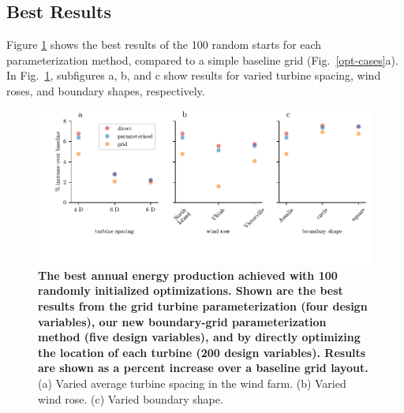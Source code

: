 \documentclass[wes, manuscript]{copernicus}
\begin{document}
\subsection{Best Results}
\label{max-results}
Figure \ref{results-max} 
shows the best results of the 100 random starts for each parameterization method, compared to a simple baseline grid (Fig.~\ref{opt-cases}a). In Fig.~\ref{results-max}, subfigures a, b, and c show results for varied turbine spacing, wind roses, and boundary shapes, respectively.

\begin{figure}
\centering
\includegraphics{paper-figures/results_max.pdf}
\caption{\textbf{The best annual energy production achieved with 100 randomly initialized optimizations. Shown are the best results from the grid turbine parameterization (four design variables), our new boundary-grid parameterization method (five design variables), and by directly optimizing the location of each turbine (200 design variables). Results are shown as a percent increase over a baseline grid layout.} (a) Varied average turbine spacing in the wind farm. (b) Varied wind rose. (c) Varied boundary shape.}
\label{results-max}
\end{figure}
\end{document}
